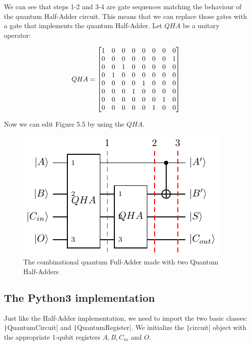 We can see that steps 1-2 and 3-4 are gate sequences matching the behaviour of the quantum Half-Adder circuit. This means that we can replace
those gates with a gate that implements the quantum Half-Adder. Let $QHA$ be a unitary operator:

\begin{equation}
    \centering
    QHA = \begin{bmatrix}
        1 & 0 & 0 & 0 & 0 & 0 & 0 & 0  \\
         0 & 0 & 0 & 0 & 0 & 0 & 0 & 1  \\
         0 & 0 & 1 & 0 & 0 & 0 & 0 & 0  \\
         0 & 1 & 0 & 0 & 0 & 0 & 0 & 0  \\
         0 & 0 & 0 & 0 & 1 & 0 & 0 & 0  \\
         0 & 0 & 0 & 1 & 0 & 0 & 0 & 0  \\
         0 & 0 & 0 & 0 & 0 & 0 & 1 & 0  \\
         0 & 0 & 0 & 0 & 0 & 1 & 0 & 0  \\
         \end{bmatrix}
\end{equation}

Now we can edit Figure 5.5 by using the $QHA$.

\begin{figure}[ht]
    \centering
    \includegraphics{images/5_Implementation/combinational_full_adder.pdf}
    \caption{The combinational quantum Full-Adder made with two Quantum Half-Adders}
\end{figure}

\subsection{The Python3 implementation}

Just like the Half-Adder implementation, we need to import the two basic classes: \\\texttt|QuantumCircuit| and
\texttt|QuantumRegister|. We initialize the \texttt|circuit| object with the appropriate 1-qubit
registers $A,B,C_{in}$ and $O$.

